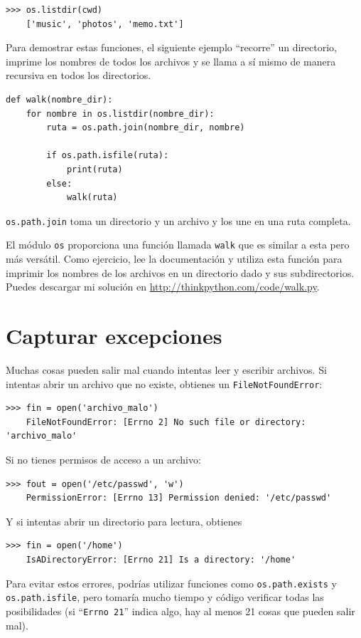 \documentclass[10pt]{book}
\begin{document}
\begin{verbatim}
>>> os.listdir(cwd)
    ['music', 'photos', 'memo.txt']
\end{verbatim}
%
Para demostrar estas funciones, el siguiente ejemplo
``recorre'' un directorio, imprime
los nombres de todos los archivos y se llama a sí mismo de manera recursiva en
todos los directorios.

\begin{verbatim}
def walk(nombre_dir):
    for nombre in os.listdir(nombre_dir):
        ruta = os.path.join(nombre_dir, nombre)

        if os.path.isfile(ruta):
            print(ruta)
        else:
            walk(ruta)
\end{verbatim}
%
{\tt os.path.join} toma un directorio y un archivo y los une
en una ruta completa.

El módulo {\tt os} proporciona una función llamada {\tt walk} que es
similar a esta pero más versátil.  Como ejercicio, lee la
documentación y utiliza esta función para imprimir los nombres de los archivos
en un directorio dado y sus subdirectorios.  Puedes descargar mi solución en
\url{http://thinkpython.com/code/walk.py}.


\section{Capturar excepciones}
\label{catch}

Muchas cosas pueden salir mal cuando intentas leer y escribir
archivos.  Si intentas abrir un archivo que no existe, obtienes un
{\tt FileNotFoundError}:

\begin{verbatim}
>>> fin = open('archivo_malo')
    FileNotFoundError: [Errno 2] No such file or directory: 'archivo_malo'
\end{verbatim}
%
Si no tienes permisos de acceso a un archivo:

\begin{verbatim}
>>> fout = open('/etc/passwd', 'w')
    PermissionError: [Errno 13] Permission denied: '/etc/passwd'
\end{verbatim}
%
Y si intentas abrir un directorio para lectura, obtienes

\begin{verbatim}
>>> fin = open('/home')
    IsADirectoryError: [Errno 21] Is a directory: '/home'
\end{verbatim}
%
Para evitar estos errores, podrías utilizar funciones como {\tt os.path.exists}
y {\tt os.path.isfile}, pero tomaría mucho tiempo y código
verificar todas las posibilidades (si ``{\tt Errno 21}'' indica
algo, hay al menos 21 cosas que pueden salir mal).
\end{document}
